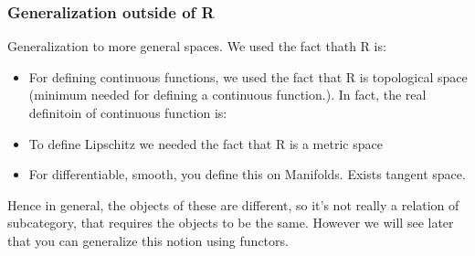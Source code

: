 {  

  \subsubsection{Generalization outside of R}
  Generalization to more general spaces.
  We used the fact thath R is:
  \begin{itemize}
    \item For defining continuous functions, we used the fact that R is topological space (minimum needed for defining a continuous function.). In fact, the real definitoin of continuous function is:


    \item To define Lipschitz we needed the fact that R is a metric space
    \item For differentiable, smooth, you define this on Manifolds. Exists tangent space.
  \end{itemize}

  Hence in general, the objects of these are different, so it's not really a relation of subcategory, that requires
  the objects to be the same. However we will see later that you can generalize this notion using functors.

}

